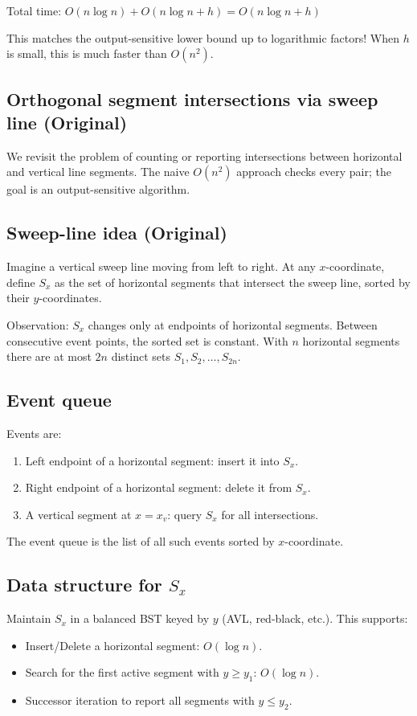 \documentclass[11pt]{article}
\begin{document}
Total time: $O(n \log n) + O(n \log n + h) = O(n \log n + h)$

This matches the output-sensitive lower bound up to logarithmic factors! When $h$ is small, this is much faster than $O(n^2)$.

\subsection*{Orthogonal segment intersections via sweep line (Original)}
We revisit the problem of counting or reporting intersections between horizontal and vertical
line segments. The naive $O(n^2)$ approach checks every pair; the goal is an output-sensitive
algorithm.

\subsection*{Sweep-line idea (Original)}
Imagine a vertical sweep line moving from left to right. At any $x$-coordinate, define $S_x$ as the
set of horizontal segments that intersect the sweep line, sorted by their $y$-coordinates.

Observation: $S_x$ changes only at endpoints of horizontal segments. Between consecutive event
points, the sorted set is constant. With $n$ horizontal segments there are at most $2n$ distinct
sets $S_1, S_2, \ldots, S_{2n}$.

\subsection*{Event queue}
Events are:
\begin{enumerate}
\item Left endpoint of a horizontal segment: insert it into $S_x$.
\item Right endpoint of a horizontal segment: delete it from $S_x$.
\item A vertical segment at $x = x_v$: query $S_x$ for all intersections.
\end{enumerate}

The event queue is the list of all such events sorted by $x$-coordinate.

\subsection*{Data structure for $S_x$}
Maintain $S_x$ in a balanced BST keyed by $y$ (AVL, red-black, etc.). This supports:
\begin{itemize}
\item Insert/Delete a horizontal segment: $O(\log n)$.
\item Search for the first active segment with $y \ge y_1$: $O(\log n)$.
\item Successor iteration to report all segments with $y \le y_2$.
\end{itemize}
\end{document}
